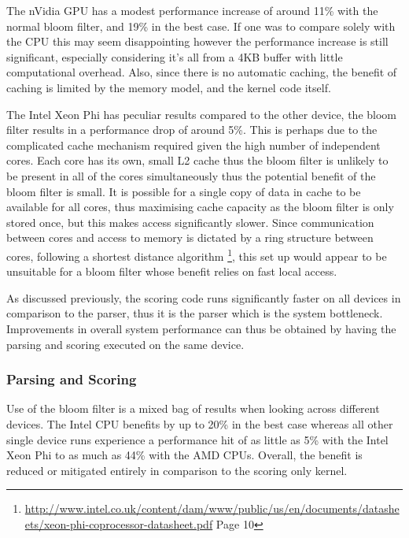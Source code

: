 The nVidia GPU has a modest performance increase of around 11\% with the normal
bloom filter, and 19\% in the best case. If one was to compare solely with the
CPU this may seem disappointing however the performance increase is still
significant, especially considering it's all from a 4KB buffer with little
computational overhead. Also, since there is no automatic caching, the benefit
of caching is limited by the memory model, and the kernel code itself.

The Intel Xeon Phi has peculiar results compared to the other device, the bloom
filter results in a performance drop of around 5\%. This is perhaps due to the
complicated cache mechanism required given the high number of independent cores.
Each core has its own, small L2 cache thus the bloom filter is unlikely to be
present in all of the cores simultaneously thus the potential benefit of the
bloom filter is small. It is possible for a single copy of data in cache to be
available for all cores, thus maximising cache capacity as the bloom filter is
only stored once, but this makes access significantly slower. Since
communication between cores and access to memory is dictated by a ring structure
between cores, following a shortest distance algorithm
\footnote{\url{http://www.intel.co.uk/content/dam/www/public/us/en/documents/datasheets/xeon-phi-coprocessor-datasheet.pdf}
Page 10}, this set up would appear to be unsuitable for a bloom filter whose
benefit relies on fast local access.

As discussed previously, the scoring code runs significantly faster on all
devices in comparison to the parser, thus it is the parser which is the system
bottleneck. Improvements in overall system performance can thus be obtained by
having the parsing and scoring executed on the same device.

\subsubsection{Parsing and Scoring}

Use of the bloom filter is a mixed bag of results when looking across different
devices. The Intel CPU benefits by up to 20\% in the best case whereas all other
single device runs experience a performance hit of as little as 5\% with the
Intel Xeon Phi to as much as 44\% with the AMD CPUs. Overall, the benefit is
reduced or mitigated entirely in comparison to the scoring only kernel.

